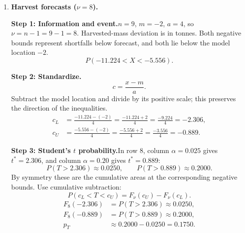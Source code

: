 \begin{enumerate}[leftmargin=*,label=\textbf{\arabic*.},itemsep=12pt,parsep=3pt,topsep=5pt]
\par\noindent\begin{minipage}{\linewidth}
\par\textbf{Step 6: Interpretation.}\nopagebreak\enspace Water use is between $27.22$ and $44.58$ cubic metres above forecast with probability about $15.00\%$ under $t$ and $15.31\%$ under normal. The normal probability is higher by $0.0031$, or $0.31$ percentage points.
\end{minipage}\par
\item \begin{minipage}[t]{\linewidth}\textbf{Harvest forecasts ($\nu=8$).}\nopagebreak
\par\textbf{Step 1: Information and event.}\nopagebreak\enspace $n=9$, $m=-2$, $a=4$, so $\nu=n-1=9-1=8$. Harvested-mass deviation is in tonnes. Both negative bounds represent shortfalls below forecast, and both lie below the model location $-2$.\[
P(-11.224<X<-5.556).
\]

\end{minipage}\par
\par\noindent\begin{minipage}{\linewidth}
\par\textbf{Step 2: Standardize.}\nopagebreak\enspace \[
c=\frac{x-m}{a}.
\]
Subtract the model location and divide by its positive scale; this preserves the direction of the inequalities.
\[
\begin{aligned}c_L&=\frac{-11.224-(-2)}{4}=\frac{-11.224+2}{4}=\frac{-9.224}{4}=-2.306,\\c_U&=\frac{-5.556-(-2)}{4}=\frac{-5.556+2}{4}=\frac{-3.556}{4}=-0.889.\end{aligned}
\]

\end{minipage}\par
\par\noindent\begin{minipage}{\linewidth}
\par\textbf{Step 3: Student's $t$ probability.}\nopagebreak\enspace In row $8$, column $\alpha=0.025$ gives $t^*=2.306$, and column $\alpha=0.20$ gives $t^*=0.889$:
\[
P(T>2.306)\approx0.0250,\qquad P(T>0.889)\approx0.2000.
\]
By symmetry these are the cumulative areas at the corresponding negative bounds. Use cumulative subtraction:
\[
P(c_L<T<c_U)=F_\nu(c_U)-F_\nu(c_L).
\]
\[
\begin{aligned}F_8(-2.306)&=P(T>2.306)\approx0.0250,\\F_8(-0.889)&=P(T>0.889)\approx0.2000,\\p_T&\approx0.2000-0.0250=\boxed{0.1750}.\end{aligned}
\]


\end{minipage}
\end{enumerate}
